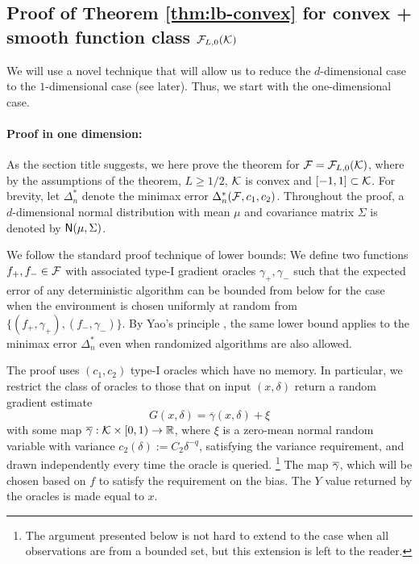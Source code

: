 \subsection{Proof of Theorem \ref{thm:lb-convex} for convex + smooth function class $\mathcal{F}_{L,0}(\mathcal{K})$}
\label{sec:appendix-lbconvex}
We will use a novel technique that will allow us to  reduce the $d$-dimensional case to the $1$-dimensional case (see later).
Thus, we start with the one-dimensional case.

\paragraph{Proof in one dimension:} 
As the section title suggests, we here prove the theorem for $\mathcal{F} = \mathcal{F}_{L,0}(\mathcal{K})$, where 
by the assumptions of the theorem, $L\ge 1/2$, $\mathcal{K}$ is convex and $[-1,1]\subset \mathcal{K}$.
For brevity, let $\Delta_n^{*}$ denote the minimax error $\Delta_n^*(\mathcal{F}, c_1,c_2)$. 
Throughout the proof, a $d$-dimensional normal distribution with mean $\mu$ and covariance matrix $\Sigma$ is denoted by $\mathsf{N}(\mu, \Sigma)$.

We follow the standard proof technique of lower bounds: We define two functions $f_+, f_- \in \mathcal{F}$ with associated type-I gradient oracles $\gamma_+,\gamma_-$ such that the expected error of any deterministic algorithm can be bounded from below for the case when the environment is chosen uniformly at random from $\{(f_+,\gamma_+),(f_-,\gamma_-)\}$. By Yao's principle
\citep{Yao77:FOCS}, the same lower bound applies to the minimax error $\Delta_n^{*}$ even when randomized algorithms are also allowed.

The proof uses $(c_1,c_2)$ type-I oracles which have no memory.
In particular, we restrict the class of oracles to those that on input $(x,\delta)$ return 
a random gradient estimate 
\begin{equation}
\label{eq:oracle}
G(x,\delta) = \overline{\gamma}(x,\delta) + \xi
\end{equation}
with some map $\overline{\gamma}: \mathcal{K} \times [0,1)\to \mathbb{R}$,
where $\xi$ is a zero-mean normal random variable with variance $c_2(\delta):= C_2 \delta^{-q}$, satisfying the variance requirement, and drawn independently every time the oracle is queried.%
\footnote{The argument presented below is not hard to extend to the case when all observations are from a bounded set,
but this extension is left to the reader.}
The map $\overline{\gamma}$, which will be chosen based on $f$ to satisfy the requirement on the bias.
The $Y$ value returned by the oracles is made equal to $x$.

